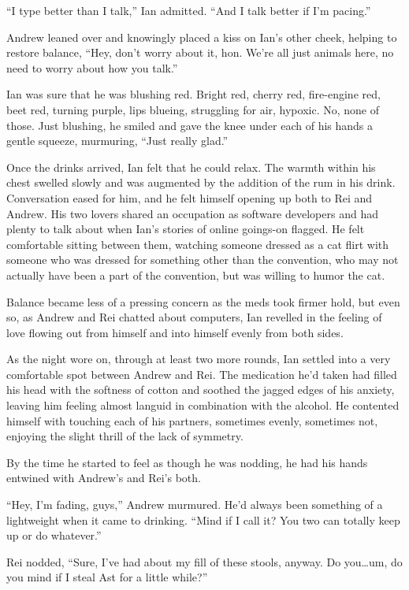 ``I type better than I talk,'' Ian admitted. ``And I talk better if I'm pacing.''

Andrew leaned over and knowingly placed a kiss on Ian's other cheek, helping to restore balance, ``Hey, don't worry about it, hon. We're all just animals here, no need to worry about how you talk.''

Ian was sure that he was blushing red. Bright red, cherry red, fire-engine red, beet red, turning purple, lips blueing, struggling for air, hypoxic. No, none of those. Just blushing, he smiled and gave the knee under each of his hands a gentle squeeze, murmuring, ``Just really glad.''

Once the drinks arrived, Ian felt that he could relax. The warmth within his chest swelled slowly and was augmented by the addition of the rum in his drink. Conversation eased for him, and he felt himself opening up both to Rei and Andrew. His two lovers shared an occupation as software developers and had plenty to talk about when Ian's stories of online goings-on flagged. He felt comfortable sitting between them, watching someone dressed as a cat flirt with someone who was dressed for something other than the convention, who may not actually have been a part of the convention, but was willing to humor the cat.

Balance became less of a pressing concern as the meds took firmer hold, but even so, as Andrew and Rei chatted about computers, Ian revelled in the feeling of love flowing out from himself and into himself evenly from both sides.

\secdiv{}

As the night wore on, through at least two more rounds, Ian settled into a very comfortable spot between Andrew and Rei. The medication he'd taken had filled his head with the softness of cotton and soothed the jagged edges of his anxiety, leaving him feeling almost languid in combination with the alcohol. He contented himself with touching each of his partners, sometimes evenly, sometimes not, enjoying the slight thrill of the lack of symmetry.

By the time he started to feel as though he was nodding, he had his hands entwined with Andrew's and Rei's both.

``Hey, I'm fading, guys,'' Andrew murmured. He'd always been something of a lightweight when it came to drinking. ``Mind if I call it? You two can totally keep up or do whatever.''

Rei nodded, ``Sure, I've had about my fill of these stools, anyway. Do you\ldots{}um, do you mind if I steal Ast for a little while?''


